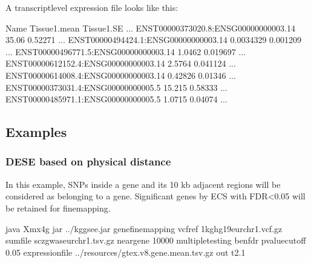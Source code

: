 \documentclass[letterpaper,10pt,english,openany,oneside]{sphinxmanual}
\begin{document}
\sphinxAtStartPar
A transcript\sphinxhyphen{}level expression file looks like this:

\begin{sphinxVerbatim}[commandchars=\\\{\}]
Name                                   Tissue1.mean   Tissue1.SE     ...
ENST00000373020.8:ENSG00000000003.14   35.06          0.52271        ...
ENST00000494424.1:ENSG00000000003.14   0.0034329      0.001209       ...
ENST00000496771.5:ENSG00000000003.14   1.0462         0.019697       ...
ENST00000612152.4:ENSG00000000003.14   2.5764         0.041124       ...
ENST00000614008.4:ENSG00000000003.14   0.42826        0.01346        ...
ENST00000373031.4:ENSG00000000005.5    15.215         0.58333        ...
ENST00000485971.1:ENSG00000000005.5    1.0715         0.04074        ...
\end{sphinxVerbatim}


\newpage
\subsection{Examples}
\label{\detokenize{detailed_document:id3}}

\subsubsection{DESE based on physical distance}
\label{\detokenize{detailed_document:dese-based-on-physical-distance}}
\sphinxAtStartPar
In this example, SNPs inside a gene and its 10 kb adjacent regions will be considered as belonging to a gene. Significant genes by ECS with FDR\textless{}0.05 will be retained for fine\sphinxhyphen{}mapping.

\begin{sphinxVerbatim}[commandchars=\\\{\}]
java \PYGZhy{}Xmx4g \PYGZhy{}jar ../kggsee.jar 
  \PYGZhy{}\PYGZhy{}gene\PYGZhy{}finemapping 
  \PYGZhy{}\PYGZhy{}vcf\PYGZhy{}ref 1kg\PYGZus{}hg19\PYGZus{}eur\PYGZus{}chr1.vcf.gz 
  \PYGZhy{}\PYGZhy{}sum\PYGZhy{}file scz\PYGZus{}gwas\PYGZus{}eur\PYGZus{}chr1.tsv.gz 
  \PYGZhy{}\PYGZhy{}neargene 10000 
  \PYGZhy{}\PYGZhy{}multiple\PYGZhy{}testing benfdr 
  \PYGZhy{}\PYGZhy{}p\PYGZhy{}value\PYGZhy{}cutoff 0.05 
  \PYGZhy{}\PYGZhy{}expression\PYGZhy{}file ../resources/gtex.v8.gene.mean.tsv.gz 
  \PYGZhy{}\PYGZhy{}out t2.1
\end{sphinxVerbatim}
\end{document}
